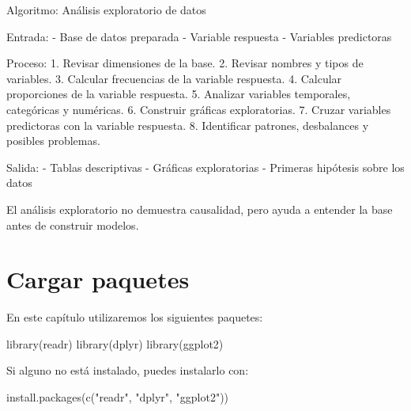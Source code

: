 \documentclass[
  11pt,
  letterpaper,
]{book}
\newenvironment{Shaded}{\begin{snugshade}}{\end{snugshade}}
\newcommand{\FunctionTok}[1]{\textcolor[rgb]{0.28,0.35,0.67}{#1}}
\newcommand{\NormalTok}[1]{\textcolor[rgb]{0.00,0.23,0.31}{#1}}
\newcommand{\StringTok}[1]{\textcolor[rgb]{0.13,0.47,0.30}{#1}}
\begin{document}
\begin{Shaded}
\begin{Highlighting}[]
\NormalTok{Algoritmo: Análisis exploratorio de datos}

\NormalTok{Entrada:}
\NormalTok{  {-} Base de datos preparada}
\NormalTok{  {-} Variable respuesta}
\NormalTok{  {-} Variables predictoras}

\NormalTok{Proceso:}
\NormalTok{  1. Revisar dimensiones de la base.}
\NormalTok{  2. Revisar nombres y tipos de variables.}
\NormalTok{  3. Calcular frecuencias de la variable respuesta.}
\NormalTok{  4. Calcular proporciones de la variable respuesta.}
\NormalTok{  5. Analizar variables temporales, categóricas y numéricas.}
\NormalTok{  6. Construir gráficas exploratorias.}
\NormalTok{  7. Cruzar variables predictoras con la variable respuesta.}
\NormalTok{  8. Identificar patrones, desbalances y posibles problemas.}

\NormalTok{Salida:}
\NormalTok{  {-} Tablas descriptivas}
\NormalTok{  {-} Gráficas exploratorias}
\NormalTok{  {-} Primeras hipótesis sobre los datos}
\end{Highlighting}
\end{Shaded}

El análisis exploratorio no demuestra causalidad, pero ayuda a entender
la base antes de construir modelos.

\section{Cargar paquetes}\label{cargar-paquetes-1}

En este capítulo utilizaremos los siguientes paquetes:

\begin{Shaded}
\begin{Highlighting}[]
\FunctionTok{library}\NormalTok{(readr)}
\FunctionTok{library}\NormalTok{(dplyr)}
\FunctionTok{library}\NormalTok{(ggplot2)}
\end{Highlighting}
\end{Shaded}

Si alguno no está instalado, puedes instalarlo con:

\begin{Shaded}
\begin{Highlighting}[]
\FunctionTok{install.packages}\NormalTok{(}\FunctionTok{c}\NormalTok{(}\StringTok{"readr"}\NormalTok{, }\StringTok{"dplyr"}\NormalTok{, }\StringTok{"ggplot2"}\NormalTok{))}
\end{Highlighting}
\end{Shaded}
\end{document}
